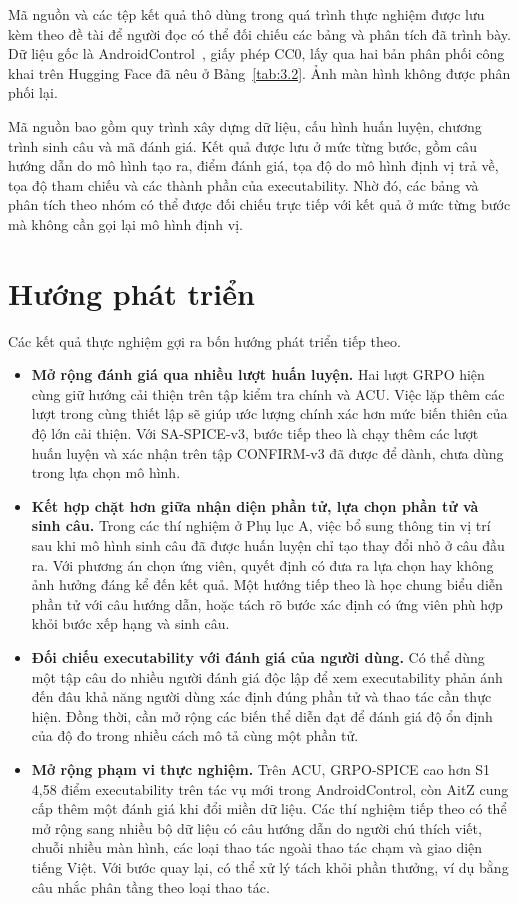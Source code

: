 Mã nguồn và các tệp kết quả thô dùng trong quá trình thực nghiệm được lưu kèm theo đề tài để người đọc có thể đối chiếu các bảng và phân tích đã trình bày. Dữ liệu gốc là AndroidControl~\cite{androidcontrol}, giấy phép CC0, lấy qua hai bản phân phối công khai trên Hugging Face đã nêu ở Bảng~\ref{tab:3.2}. Ảnh màn hình không được phân phối lại.

Mã nguồn bao gồm quy trình xây dựng dữ liệu, cấu hình huấn luyện, chương trình sinh câu và mã đánh giá. Kết quả được lưu ở mức từng bước, gồm câu hướng dẫn do mô hình tạo ra, điểm đánh giá, tọa độ do mô hình định vị trả về, tọa độ tham chiếu và các thành phần của executability. Nhờ đó, các bảng và phân tích theo nhóm có thể được đối chiếu trực tiếp với kết quả ở mức từng bước mà không cần gọi lại mô hình định vị.

\section{Hướng phát triển}\label{sec:7.4}

Các kết quả thực nghiệm gợi ra bốn hướng phát triển tiếp theo.
\enlargethispage{\baselineskip}

\begin{itemize}
\setlength{\itemsep}{0pt}
\item \textbf{Mở rộng đánh giá qua nhiều lượt huấn luyện.} Hai lượt GRPO hiện cùng giữ hướng cải thiện trên tập kiểm tra chính và ACU. Việc lặp thêm các lượt trong cùng thiết lập sẽ giúp ước lượng chính xác hơn mức biến thiên của độ lớn cải thiện. Với SA-SPICE-v3, bước tiếp theo là chạy thêm các lượt huấn luyện và xác nhận trên tập CONFIRM-v3 đã được để dành, chưa dùng trong lựa chọn mô hình.
\item \textbf{Kết hợp chặt hơn giữa nhận diện phần tử, lựa chọn phần tử và sinh câu.} Trong các thí nghiệm ở Phụ lục A, việc bổ sung thông tin vị trí sau khi mô hình sinh câu đã được huấn luyện chỉ tạo thay đổi nhỏ ở câu đầu ra. Với phương án chọn ứng viên, quyết định có đưa ra lựa chọn hay không ảnh hưởng đáng kể đến kết quả. Một hướng tiếp theo là học chung biểu diễn phần tử với câu hướng dẫn, hoặc tách rõ bước xác định có ứng viên phù hợp khỏi bước xếp hạng và sinh câu.
\item \textbf{Đối chiếu executability với đánh giá của người dùng.} Có thể dùng một tập câu do nhiều người đánh giá độc lập để xem executability phản ánh đến đâu khả năng người dùng xác định đúng phần tử và thao tác cần thực hiện. Đồng thời, cần mở rộng các biến thể diễn đạt để đánh giá độ ổn định của độ đo trong nhiều cách mô tả cùng một phần tử.
\item \textbf{Mở rộng phạm vi thực nghiệm.} Trên ACU, GRPO-SPICE cao hơn S1 4,58 điểm executability trên tác vụ mới trong AndroidControl, còn AitZ cung cấp thêm một đánh giá khi đổi miền dữ liệu. Các thí nghiệm tiếp theo có thể mở rộng sang nhiều bộ dữ liệu có câu hướng dẫn do người chú thích viết, chuỗi nhiều màn hình, các loại thao tác ngoài thao tác chạm và giao diện tiếng Việt. Với bước quay lại, có thể xử lý tách khỏi phần thưởng, ví dụ bằng câu nhắc phân tầng theo loại thao tác.
\end{itemize}

